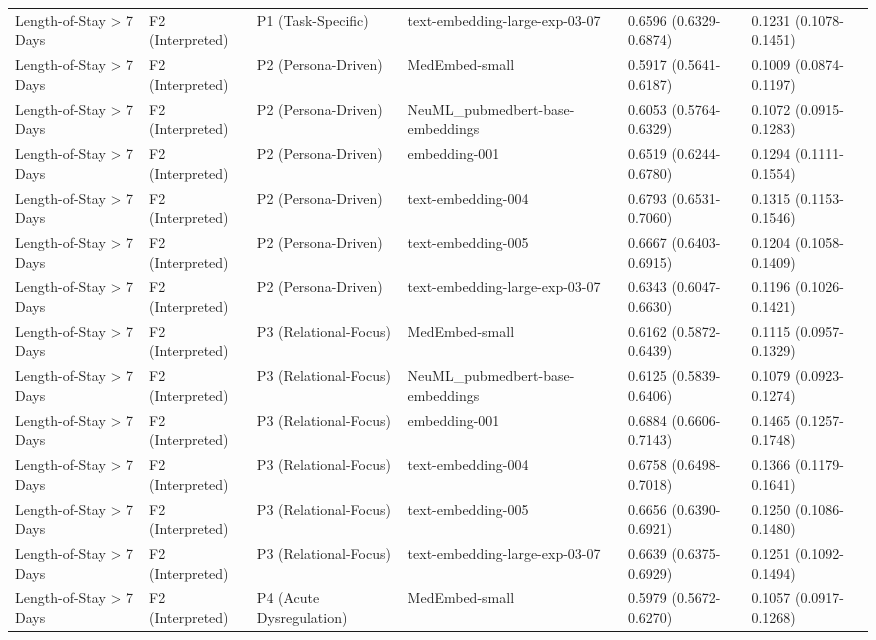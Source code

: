 \documentclass[border=0pt]{standalone}
\begin{document}
\begin{adjustbox}{width=\textwidth}
\begin{tabular}{llllll}
Length-of-Stay \textgreater{} 7 Days & F2 (Interpreted) & P1 (Task-Specific) & text-embedding-large-exp-03-07 & 0.6596 (0.6329-0.6874) & 0.1231 (0.1078-0.1451) \\
Length-of-Stay \textgreater{} 7 Days & F2 (Interpreted) & P2 (Persona-Driven) & MedEmbed-small & 0.5917 (0.5641-0.6187) & 0.1009 (0.0874-0.1197) \\
Length-of-Stay \textgreater{} 7 Days & F2 (Interpreted) & P2 (Persona-Driven) & NeuML\_pubmedbert-base-embeddings & 0.6053 (0.5764-0.6329) & 0.1072 (0.0915-0.1283) \\
Length-of-Stay \textgreater{} 7 Days & F2 (Interpreted) & P2 (Persona-Driven) & embedding-001 & 0.6519 (0.6244-0.6780) & 0.1294 (0.1111-0.1554) \\
Length-of-Stay \textgreater{} 7 Days & F2 (Interpreted) & P2 (Persona-Driven) & text-embedding-004 & 0.6793 (0.6531-0.7060) & 0.1315 (0.1153-0.1546) \\
Length-of-Stay \textgreater{} 7 Days & F2 (Interpreted) & P2 (Persona-Driven) & text-embedding-005 & 0.6667 (0.6403-0.6915) & 0.1204 (0.1058-0.1409) \\
Length-of-Stay \textgreater{} 7 Days & F2 (Interpreted) & P2 (Persona-Driven) & text-embedding-large-exp-03-07 & 0.6343 (0.6047-0.6630) & 0.1196 (0.1026-0.1421) \\
Length-of-Stay \textgreater{} 7 Days & F2 (Interpreted) & P3 (Relational-Focus) & MedEmbed-small & 0.6162 (0.5872-0.6439) & 0.1115 (0.0957-0.1329) \\
Length-of-Stay \textgreater{} 7 Days & F2 (Interpreted) & P3 (Relational-Focus) & NeuML\_pubmedbert-base-embeddings & 0.6125 (0.5839-0.6406) & 0.1079 (0.0923-0.1274) \\
Length-of-Stay \textgreater{} 7 Days & F2 (Interpreted) & P3 (Relational-Focus) & embedding-001 & 0.6884 (0.6606-0.7143) & 0.1465 (0.1257-0.1748) \\
Length-of-Stay \textgreater{} 7 Days & F2 (Interpreted) & P3 (Relational-Focus) & text-embedding-004 & 0.6758 (0.6498-0.7018) & 0.1366 (0.1179-0.1641) \\
Length-of-Stay \textgreater{} 7 Days & F2 (Interpreted) & P3 (Relational-Focus) & text-embedding-005 & 0.6656 (0.6390-0.6921) & 0.1250 (0.1086-0.1480) \\
Length-of-Stay \textgreater{} 7 Days & F2 (Interpreted) & P3 (Relational-Focus) & text-embedding-large-exp-03-07 & 0.6639 (0.6375-0.6929) & 0.1251 (0.1092-0.1494) \\
Length-of-Stay \textgreater{} 7 Days & F2 (Interpreted) & P4 (Acute Dysregulation) & MedEmbed-small & 0.5979 (0.5672-0.6270) & 0.1057 (0.0917-0.1268) \\

\end{tabular}
\end{adjustbox}
\end{document}
